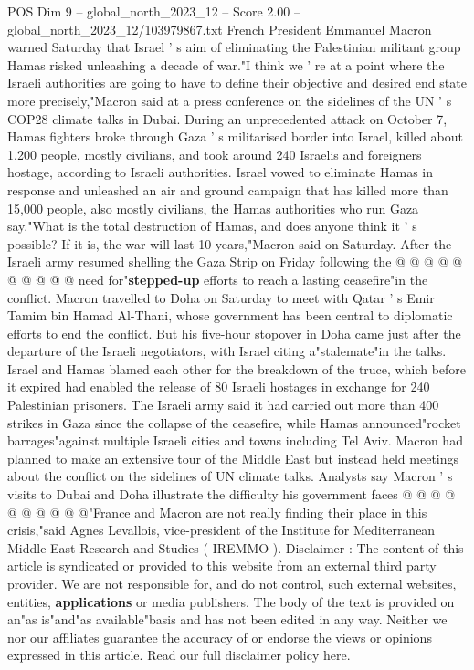 \begin{textsample}{POS Dim 9 – global\_north\_2023\_12 – Score 2.00 – global\_north\_2023\_12/103979867.txt}  \label{ex:f9_pos_368}
French President Emmanuel Macron warned Saturday that Israel ' s aim of eliminating the Palestinian militant group Hamas risked unleashing a decade of war."I think we ' re at a point where the Israeli authorities are going to have to define their objective and desired end state more precisely,"Macron said at a press conference on the sidelines of the UN ' s COP28 climate talks in Dubai.
During an unprecedented attack on October 7, Hamas fighters broke through Gaza ' s militarised border into Israel, killed about 1,200 people, mostly civilians, and took around 240 Israelis and foreigners hostage, according to Israeli authorities.
Israel vowed to eliminate Hamas in response and unleashed an air and ground campaign that has killed more than 15,000 people, also mostly civilians, the Hamas authorities who run Gaza say."What is the total destruction of Hamas, and does anyone think it ' s possible?
If it is, the war will last 10 years,"Macron said on Saturday.
After the Israeli army resumed shelling the Gaza Strip on Friday following the @ @ @ @ @ @ @ @ @ @ need for"\textbf{stepped-up} efforts to reach a lasting ceasefire"in the conflict.
Macron travelled to Doha on Saturday to meet with Qatar ' s Emir Tamim bin Hamad Al-Thani, whose government has been central to diplomatic efforts to end the conflict.
But his five-hour stopover in Doha came just after the departure of the Israeli negotiators, with Israel citing a"stalemate"in the talks.
Israel and Hamas blamed each other for the breakdown of the truce, which before it expired had enabled the release of 80 Israeli hostages in exchange for 240 Palestinian prisoners.
The Israeli army said it had carried out more than 400 strikes in Gaza since the collapse of the ceasefire, while Hamas announced"rocket barrages"against multiple Israeli cities and towns including Tel Aviv.
Macron had planned to make an extensive tour of the Middle East but instead held meetings about the conflict on the sidelines of UN climate talks.
Analysts say Macron ' s visits to Dubai and Doha illustrate the difficulty his government faces @ @ @ @ @ @ @ @ @ @"France and Macron are not really finding their place in this crisis,"said Agnes Levallois, vice-president of the Institute for Mediterranean Middle East Research and Studies ( IREMMO ).
Disclaimer : The content of this article is syndicated or provided to this website from an external third party provider.
We are not responsible for, and do not control, such external websites, entities, \textbf{applications} or media publishers.
The body of the text is provided on an"as is"and"as available"basis and has not been edited in any way.
Neither we nor our affiliates guarantee the accuracy of or endorse the views or opinions expressed in this article.
Read our full disclaimer policy here.

\end{textsample}
